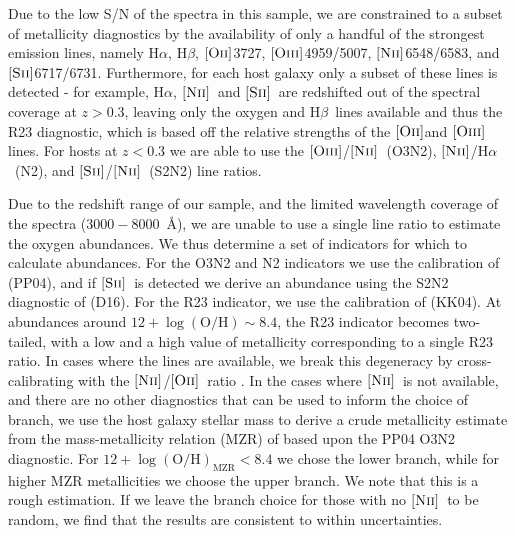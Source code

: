 \documentclass[fleqn,usenatbib,]{mnras}
\newcommand{\halpha}[0]{H$\alpha$}
\newcommand{\hbeta}[0]{H$\beta$}
\newcommand{\OII}[0]{$[\textnormal{\textsc{Oii}}]$}
\newcommand{\OIII}[0]{$[\textnormal{\textsc{Oiii}}]$}
\newcommand{\SII}[0]{$[\textnormal{\textsc{Sii}}]$}
\newcommand{\NII}[0]{$[\textnormal{\textsc{Nii}}]$}
\begin{document}
Due to the low S/N of the spectra in this sample, we are constrained to a subset of metallicity diagnostics by the availability of only a handful of the strongest emission lines, namely \halpha, \hbeta, \OII 3727, \OIII 4959/5007, \NII 6548/6583, and \SII 6717/6731. Furthermore, for each host galaxy only a subset of these lines is detected - for example, \halpha, \NII~and \SII~are redshifted out of the spectral coverage at $z>0.3$, leaving only the oxygen and \hbeta~lines available and thus the R23 diagnostic, which is based off the relative strengths of the \OII and \OIII lines. For hosts at $z<0.3$ we are able to use the \OIII /\NII~(O3N2), \NII /\halpha~(N2), and \SII /\NII~(S2N2) line ratios. 

Due to the redshift range of our sample, and the limited wavelength coverage of the spectra ($3000-8000$~\AA), we are unable to use a single line ratio to estimate the oxygen abundances. We thus determine a set of indicators for which to calculate abundances. For the O3N2 and N2 indicators we use the calibration of \citet{Pettini2004} (PP04), and if \SII~is detected we derive an abundance using the S2N2 diagnostic of \citet{Dopita2016} (D16). For the R23 indicator, we use the calibration of \citet{Kobulnicky2004} (KK04). At abundances around $12 + \log \mathrm{(O/H)} \sim 8.4$, the R23 indicator becomes two-tailed, with a low and a high value of metallicity corresponding to a single R23 ratio. In cases where the lines are available, we break this degeneracy by cross-calibrating with the \NII/\OII~ratio \citep{Kewley2008}. In the cases where \NII~is not available, and there are no other diagnostics that can be used to inform the choice of branch, we use the host galaxy stellar mass to derive a crude metallicity estimate from the mass-metallicity relation (MZR) of \citet{Kewley2008} based upon the PP04 O3N2 diagnostic. For $12 + \log \mathrm{(O/H)}_{\mathrm{MZR}} < 8.4$ we chose the lower branch, while for higher MZR metallicities we choose the upper branch. We note that this is a rough estimation. If we leave the branch choice for those with no \NII~to be random, we find that the results are consistent to within uncertainties. 
\end{document}
